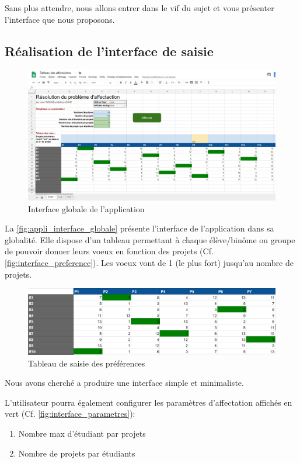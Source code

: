 \documentclass{polytech/polytech}
\begin{document}
Sans plus attendre, nous allons entrer dans le vif du sujet et vous présenter l'interface que nous proposons.

\subsection{Réalisation de l'interface de saisie}

\begin{figure}
\includegraphics[width=15cm]{images/interface_appli_globale}
\caption{\label{fig:appli_interface_globale} Interface globale de l'application}
\end{figure}

La \autoref{fig:appli_interface_globale} présente l'interface de l'application dans sa globalité.
Elle dispose d'un tableau permettant à chaque élève/binôme ou groupe de pouvoir donner leurs voeux en fonction des projets (Cf. \autoref{fig:interface_preference}). Les voeux vont de 1 (le plus fort) jusqu’au nombre de projets.

\begin{figure}
\includegraphics[width=15cm]{images/interface_preferences}
\caption{\label{fig:interface_preference}Tableau de saisie des préférences}
\end{figure}

Nous avons cherché a produire une interface simple et minimaliste.

L’utilisateur pourra également configurer les paramètres d'affectation affichés en vert (Cf. \autoref{fig:interface_parametres}):
\begin{enumerate}
\item Nombre max d’étudiant par projets
\item Nombre de projets par étudiants
\end{enumerate}
\end{document}
